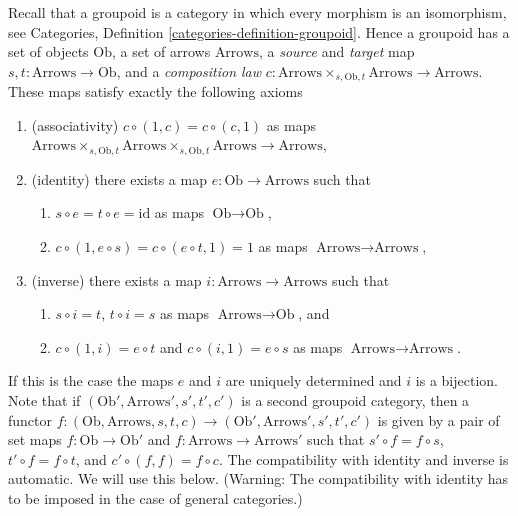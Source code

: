 \documentclass{amsart}
\theoremstyle{plain}
\theoremstyle{definition}
\theoremstyle{remark}
\numberwithin{equation}{subsection}
\begin{document}
\noindent
Recall that a groupoid is a category in which every morphism
is an isomorphism, see
Categories, Definition \ref{categories-definition-groupoid}.
Hence a groupoid has a set of objects $\text{Ob}$,
a set of arrows $\text{Arrows}$, a {\it source} and {\it target}
map $s, t : \text{Arrows} \to \text{Ob}$, and a {\it composition law}
$c : \text{Arrows} \times_{s, \text{Ob}, t} \text{Arrows}
\to \text{Arrows}$.
These maps satisfy exactly the following axioms
\begin{enumerate}
\item (associativity) $c \circ (1, c) = c \circ (c, 1)$ as maps
$\text{Arrows} \times_{s, \text{Ob}, t}
\text{Arrows} \times_{s, \text{Ob}, t}
\text{Arrows} \to \text{Arrows}$,
\item (identity) there exists a map $e : \text{Ob} \to \text{Arrows}$
such that
\begin{enumerate}
\item $s \circ e = t \circ e = \text{id}$ as maps $\text{Ob} \to \text{Ob}$,
\item $c \circ (1, e \circ s) = c \circ (e \circ t, 1) = 1$
as maps $\text{Arrows} \to \text{Arrows}$,
\end{enumerate}
\item (inverse) there exists a map $i : \text{Arrows} \to \text{Arrows}$
such that
\begin{enumerate}
\item $s \circ i = t$, $t \circ i = s$ as maps $\text{Arrows} \to \text{Ob}$,
and
\item $c \circ (1, i) = e \circ t$ and $c \circ (i, 1) = e \circ s$
as maps $\text{Arrows} \to \text{Arrows}$.
\end{enumerate}
\end{enumerate}
If this is the case the maps $e$ and $i$ are uniquely determined and
$i$ is a bijection. Note that if $(\text{Ob}', \text{Arrows}', s', t', c')$
is a second groupoid category, then a functor
$f : (\text{Ob}, \text{Arrows}, s, t, c) \to
(\text{Ob}', \text{Arrows}', s', t', c')$
is given by a pair of set maps $f : \text{Ob} \to \text{Ob}'$ and
$f : \text{Arrows} \to \text{Arrows}'$ such that
$s' \circ f = f \circ s$, $t' \circ f = f \circ t$, and
$c' \circ (f, f) = f \circ c$. The compatibility with identity and
inverse is automatic. We will use this below.
(Warning: The compatibility with identity
has to be imposed in the case of general categories.)
\end{document}
